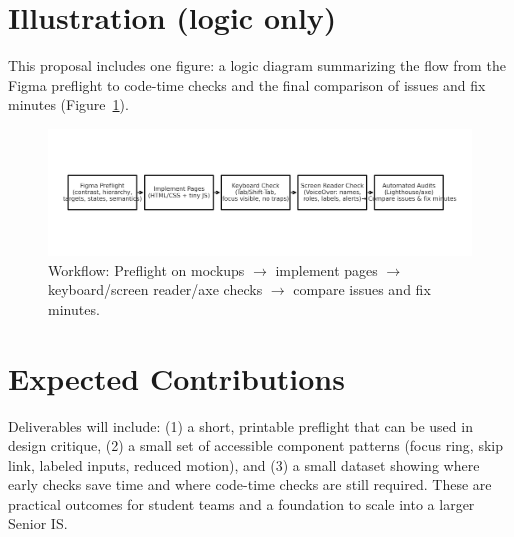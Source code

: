 \documentclass[12pt]{article}
\begin{document}
\section*{Illustration (logic only)}
This proposal includes one figure: a logic diagram summarizing the flow from the Figma preflight to code-time checks and the final comparison of issues and fix minutes (Figure~\ref{fig:logic}).

\begin{figure}[h]
  \centering
  \includegraphics[width=0.95\linewidth]{imgs/logic-diagram.png}
  \caption{Workflow: Preflight on mockups $\rightarrow$ implement pages $\rightarrow$ keyboard/screen reader/axe checks $\rightarrow$ compare issues and fix minutes.}
  \label{fig:logic}
\end{figure}

\section*{Expected Contributions}
Deliverables will include: (1) a short, printable preflight that can be used in design critique, (2) a small set of accessible component patterns (focus ring, skip link, labeled inputs, reduced motion), and (3) a small dataset showing where early checks save time and where code-time checks are still required. These are practical outcomes for student teams and a foundation to scale into a larger Senior IS.

\newpage
\end{document}
